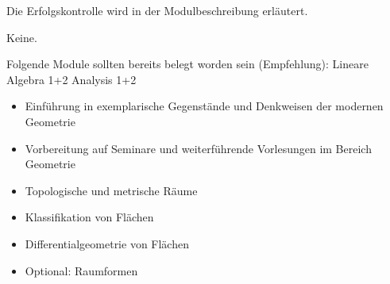 \begin{course}

\setdoclanguagegerman
{}


\courselevel{}
\courseinstructionlanguage{}

\coursehead


\label{cour_7867.dp_997}


\begin{styleenv}
\begin{assessment}
Die Erfolgskontrolle wird in der Modulbeschreibung erläutert.


\end{assessment}

\begin{conditions}Keine.\end{conditions}

\begin{recommendations}Folgende Module sollten bereits belegt worden sein (Empfehlung):\newline
Lineare Algebra 1+2\newline
Analysis 1+2

\end{recommendations}
\end{styleenv}

\begin{learningoutcomes}
\begin{itemize}\item Einführung in exemplarische Gegenstände und Denkweisen der modernen Geometrie  \item Vorbereitung auf Seminare und weiterführende Vorlesungen im Bereich Geometrie  \end{itemize}
\end{learningoutcomes}

\begin{content}
\begin{itemize}\item Topologische und metrische Räume  \item Klassifikation von Flächen  \item Differentialgeometrie von Flächen  \item Optional: Raumformen  \end{itemize}
\end{content}







\end{course}